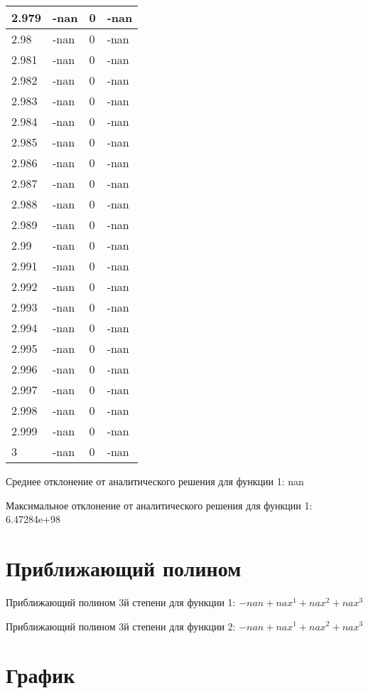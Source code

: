 \documentclass[a4paper,14pt]{extarticle}
\begin{document}
\begin{longtable}{||m{3cm}||m{3cm}|m{3cm}||m{3cm}||}
\hline
2.979 & -nan & 0 & -nan\\
\hline
2.98 & -nan & 0 & -nan\\
\hline
2.981 & -nan & 0 & -nan\\
\hline
2.982 & -nan & 0 & -nan\\
\hline
2.983 & -nan & 0 & -nan\\
\hline
2.984 & -nan & 0 & -nan\\
\hline
2.985 & -nan & 0 & -nan\\
\hline
2.986 & -nan & 0 & -nan\\
\hline
2.987 & -nan & 0 & -nan\\
\hline
2.988 & -nan & 0 & -nan\\
\hline
2.989 & -nan & 0 & -nan\\
\hline
2.99 & -nan & 0 & -nan\\
\hline
2.991 & -nan & 0 & -nan\\
\hline
2.992 & -nan & 0 & -nan\\
\hline
2.993 & -nan & 0 & -nan\\
\hline
2.994 & -nan & 0 & -nan\\
\hline
2.995 & -nan & 0 & -nan\\
\hline
2.996 & -nan & 0 & -nan\\
\hline
2.997 & -nan & 0 & -nan\\
\hline
2.998 & -nan & 0 & -nan\\
\hline
2.999 & -nan & 0 & -nan\\
\hline
3 & -nan & 0 & -nan\\
\hline
\end{longtable}

Среднее отклонение от аналитического решения для функции 1: nan

Максимальное отклонение от аналитического решения для функции 1: 6.47284e+98

\section{Приближающий полином}

Приближающий полином 3й степени для функции 1: $-nan + nax^1 + nax^2 + nax^3$

Приближающий полином 3й степени для функции 2: $-nan + nax^1 + nax^2 + nax^3$

\section{График}
\end{document}
